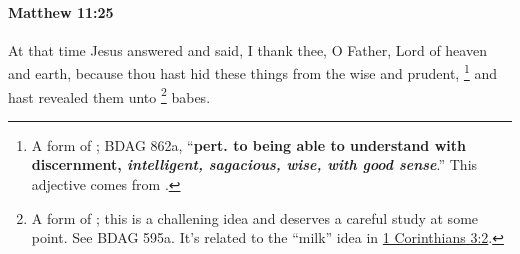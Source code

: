 			\begin{framed}
			\scriptsize
				\begin{compactdesc}
					\item[SBLG] 
				\end{compactdesc}
			\end{framed}

		\paragraph{Matthew 11:25} %
			\label{MATTHEW-11-25}

			At that time Jesus answered and said, I thank thee, O Father, Lord of heaven and earth, because thou hast hid these things from the wise and prudent,%
				\footnote{%
					A form of ; BDAG 862a, ``\textbf{pert. to being able to understand with discernment, \textit{intelligent, sagacious, wise, with good sense}}.'' This adjective comes from .
					}
			and hast revealed them unto
				\footnote{%
					A form of ; this is a challening idea and deserves a careful study at some point. See BDAG 595a. It's related to the ``milk'' idea in \hyperref[1CORINTHIANS-3-2]{1 Corinthians 3:2}.
					}%
			babes.

